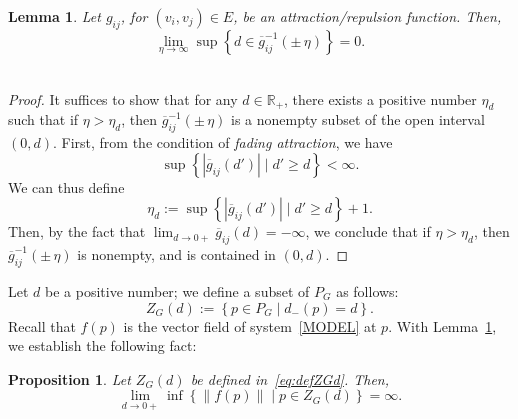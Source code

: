 \documentclass[10pt,twocolumn,twoside]{IEEEtran}
\newtheorem{pro}{Proposition}
\newtheorem{lem}{Lemma}
\newcommand{\R}{\mathbb{R}}
\newcommand{\ol}{\overline}
\renewcommand{\(}{\left (}
\renewcommand{\)}{\right )}
\renewcommand{\;}{\,;\,}
\begin{document}
\begin{lem}\label{lem:lem2}
Let $g_{ij}$, for $(v_i,v_j) \in E$, be an attraction/repulsion function. Then,  
$$
\lim_{\eta \to \infty} \sup \left \{d \in  \ol g^{-1}_{ij}\(\pm\, \eta \)  \right \} = 0.
$$ \,
\end{lem}

\begin{proof}
It suffices to show that for any $d\in \R_+$, there exists a positive number $\eta_d$ such that if $\eta > \eta_d$, then $\ol g^{-1}_{ij}\(\pm \, \eta\)$ is a nonempty subset of the open interval $(0,d)$.  
First, from the condition of {\it fading attraction}, we have 
$$
 \sup \left \{|\ol g_{ij}(d')| \mid d' \ge d  \right \} < \infty. 
$$
We can thus define 
$$
\eta_d :=  \sup \left \{|\ol g_{ij}(d')| \mid d' \ge  d\right \} + 1.
$$
Then,  by the fact that $\lim_{d \to 0+} \ol g_{ij}(d) = -\infty$,   
we conclude that if $\eta > \eta_d$, then $\ol g^{-1}_{ij}\(\pm \, \eta \)$ is nonempty, and is contained in $(0,d)$.  
\end{proof}


Let $d$ be a positive number;  we define a subset of $P_G$ as follows: 
\begin{equation}\label{eq:defZGd}
Z_G(d) := \left \{ p\in P_G\mid d_-(p) = d \right \}.
\end{equation}
Recall that $f(p)$ is the vector field of system~\eqref{MODEL} at $p$. With Lemma~\ref{lem:lem2}, we establish the following fact:

\begin{pro}\label{pro:nmvecfld}
Let $Z_G(d)$ be defined in~\eqref{eq:defZGd}. Then, 
$$
 \lim_{d\to 0+} \inf \left \{ \|f(p)\| \mid p\in Z_G(d) \right \} = \infty. 
$$\, 
\end{pro}
\end{document}
